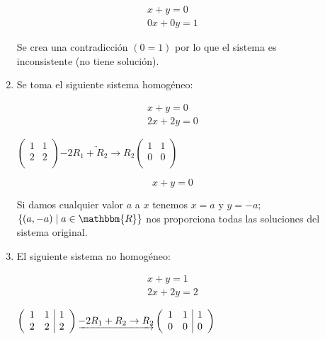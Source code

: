 \documentclass[12pt]{article}
\begin{document}
\begin{description}
\begin{enumerate}
\begin{eqnarray}
x + y = 0      \nonumber \\
0 x + 0 y  = 1 \nonumber
\end{eqnarray}

Se crea una contradicción $(0 = 1)$ por lo que el sistema es inconsistente (no tiene solución).

\item
Se toma el siguiente sistema homogéneo:

\begin{eqnarray}
x + y = 0 	   \nonumber \\
2 x + 2 y = 0 \nonumber
\end{eqnarray}

\begin{math}
\begin{pmatrix}
1 & 1 \\
2 & 2 \\
\end{pmatrix}
\underrightarrow{-2 R_1 + R_2 \to R_2}
\begin{pmatrix}
1 & 1 \\
0 & 0 \\
\end{pmatrix}
\end{math}

\begin{equation}
x + y = 0 \nonumber
\end{equation}

Si damos cualquier valor $a$ a $x$ tenemos $x = a$ y $y = -a$; $\left\{ (a, -a) \mid a \in \mathbbm{R} \right\}$ nos proporciona todas las soluciones del sistema original.

\item
El siguiente sistema no homogéneo:

\begin{eqnarray}
x + y = 1      \nonumber \\
2 x + 2 y  = 2 \nonumber
\end{eqnarray}

\begin{math}
\left(
\begin{array}{c c|c}
1 & 1 & 1 \\
2 & 2 & 2 \\
\end{array}
\right)
\underrightarrow{-2 R_1 + R_2 \to R_2}
\left(
\begin{array}{c c|c}
1 & 1 & 1 \\
0 & 0 & 0 \\
\end{array}
\right)
\end{math}


\end{enumerate}
\end{description}
\end{document}
